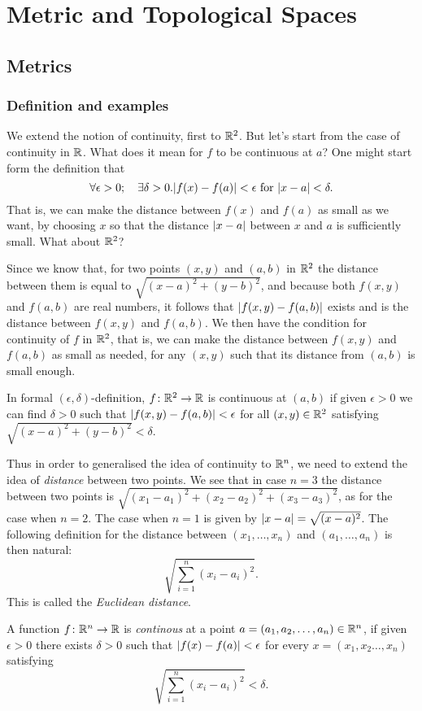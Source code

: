 \documentclass[main.tex]{subfiles}
\begin{document}
	\chapter{Metric and Topological Spaces}
	\section{Metrics}
	\subsection{Definition and examples}
		We extend the notion of continuity, first to $\mathbb R^2$.
		But let's start from the case of continuity in $\mathbb R$. What does it mean for $f$ to be continuous at $a$? One might start form the definition that
		\begin{equation*}
			\forall\epsilon > 0;\quad \exists\delta > 0. \lvert f(x) - f(a)\rvert < \epsilon \text{ for } \lvert x - a\rvert < \delta.
		\end{equation*}
		That is, we can make the distance between $f(x)$ and $f(a)$ as small as we want, by choosing $x$ so that the distance $\lvert x - a\rvert$ between $x$ and $a$ is sufficiently small. What about $\mathbb R^2$?
		
		Since we know that, for two points $(x,y)$ and $(a,b)$ in $\mathbb R^2$ the distance between them is equal to $\sqrt{(x - a)^2 + (y - b)^2}$, and because both $f(x,y)$ and $f(a,b)$ are real numbers, it follows that $\lvert f(x, y) - f(a, b)\rvert$ exists and is the distance between $f(x,y)$ and $f(a,b)$. We then have the condition for continuity of $f$ in $\mathbb R^2$, that is, we can make the distance between $f(x,y)$ and $f(a,b)$ as small as needed, for any $(x,y)$ such that its distance from $(a, b)$ is small enough.
		
		In formal $(\epsilon, \delta)$-definition, $f\colon\mathbb R^2\to\mathbb R$ is continuous at $(a,b)$ if given $\epsilon > 0$ we can find $\delta>0$ such that $\lvert f(x, y) - f(a, b)\rvert < \epsilon $ for all $(x,y) \in \mathbb R^2$ satisfying $\sqrt{(x - a)^2 + (y - b)^2} < \delta$.
		
		Thus in order to generalised the idea of continuity to $\mathbb R^n$, we need to extend the idea of \textit{distance} between two points. We see that in case $n = 3$ the distance between two points is $\sqrt{(x_1 - a_1)^2 + (x_2 - a_2)^2 + (x_3 - a_3)^2}$, as for the case when $n = 2$. The case when $n = 1$ is given by $\lvert x - a\rvert = \sqrt{(x - a)^2}$. The following definition for the distance between $(x_1, \ldots, x_n)$ and $(a_1,\ldots,a_n)$ is then natural:
		\begin{equation*}
			\sqrt{\sum_{i = 1}^n (x_i - a_i)^2}.
		\end{equation*}
		This is called the \textit{Euclidean distance}.
		\begin{definition}
			A function $f \colon \mathbb R^n \rightarrow \mathbb R$ is \textit{continous} at a point $a = (a_1, a_2, \ldots, a_n) \in \mathbb R^n$, if given $\epsilon >0$ there exists $\delta > 0$ such that $\lvert f(x) - f(a)\rvert < \epsilon$ for every $x = (x_1, x_2 \ldots, x_n)$ satisfying
			\begin{equation*}
				\sqrt{\sum_{i = 1}^{n} \left(x_i - a_i\right)^2} < \delta.
			\end{equation*}
		\end{definition}
	
\end{document}
